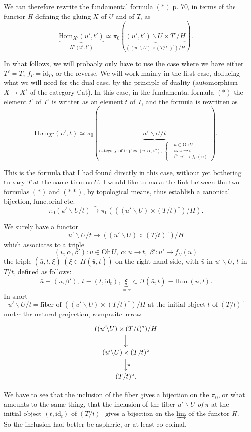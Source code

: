 \documentclass[11pt]{article}
\newcommand{\printedpage}[1]{\marginpar{\footnotesize p.~#1}}
\newcommand{\msp}[1]{\marginpar{\footnotesize [#1]}}
\newcommand{\Hom}{\mathrm{Hom}}
\newcommand{\id}{\mathrm{id}}
\newcommand{\Ob}{\mathrm{Ob}\,}
\begin{document}
\msp{page 72} We can therefore rewrite the fundamental formula $(*)$ p. 70, in terms of the functor $H$ defining the gluing $X$ of $U$ and of $T$, as
\[
\boxed{\underbrace{\Hom_{X'}(u',t')}_{H'(u',t')} \simeq \pi_0(\underbrace{(u',t')\backslash U\times T^{\circ}/H}_{((u'\backslash U)\times(T/t')^{\circ})/H}).}
\tag*{$(*)$}
\]

In what follows, we will probably only have to use the case where we have either $T'=T$, $f_T=\id_T$, or the reverse. We will work mainly in the first case, deducing what we will need for the dual case, by the principle of duality (automorphism $X\longmapsto X^{\circ}$ of the
\printedpage{52}
category Cat). In this case, in the fundamental formula $(*)$ the element $t'$ of $T'$ is written as an element $t$ of $T$, and the formula is rewritten as
\[
\boxed{\Hom_{X'}(u',t) \simeq \pi_0(\underbrace{u'\backslash U/t}_{\text{category of triples } (u,\alpha,\beta'),\ \left\{\begin{aligned} &u\in \Ob U\\ &\alpha : u\longrightarrow t\\ &\beta' : u'\longrightarrow f_U(u)\end{aligned}\right.}).}
\tag*{$(**)$}
\]

This is the formula that I had found directly in this case, without yet bothering to vary $T$ at the same time as $U$. I would like to make the link between the two formulas $(*)$ and $(**)$, by topological means, thus establish a canonical bijection, functorial etc.
\[
\pi_0(u'\backslash U/t) \xrightarrow{\sim} \pi_0(((u'\backslash U)\times(T/t)^{\circ})/H).
\]

\msp{page 73} We surely have a functor
\[
u'\backslash U/t \longrightarrow ((u'\backslash U)\times(T/t)^{\circ})/H
\]
which associates to a triple
\[
(u,\alpha,\beta') : u\in \Ob U,\ \alpha : u\longrightarrow t,\ \beta' : u'\longrightarrow f_U(u)
\]
the triple $(\bar u,\bar t,\xi)$ $(\xi\in H(\bar u,\bar t))$ on the right-hand side, with $\bar u$ in $u'\backslash U$, $\bar t$ in $T/t$, defined as follows:
\[
\bar u = (u,\beta'),\ \bar t = (t,\id_t), \underbrace{\xi}_{=\alpha} \in H(\bar u,\bar t) = \Hom(u,t).
\]
In short
\[
u'\backslash U/t = \text{fiber of } ((u'\backslash U)\times(T/t)^{\circ})/H \text{ at the initial object } \bar t \text{ of } (T/t)^{\circ}
\]
under the natural projection, composite arrow
\[
\begin{tikzcd}
((u'\backslash U)\times(T/t)^{\circ})/H \arrow[d] \\
(u'\backslash U)\times(T/t)^{\circ} \arrow[d, "\pi"] \\
(T/t)^{\circ}.
\end{tikzcd}
\]

We have to see that the inclusion of the fiber gives a bijection on the $\pi_0$, or what amounts to the same thing, that the inclusion of the fiber $u'\backslash U$ \textit{of} $\pi$ at the initial object $(t,\id_t)$ of $(T/t)^{\circ}$ gives a bijection on the $\varinjlim$ of the functor $H$. So the inclusion had better be aspheric, or at least co-cofinal. %
\end{document}
